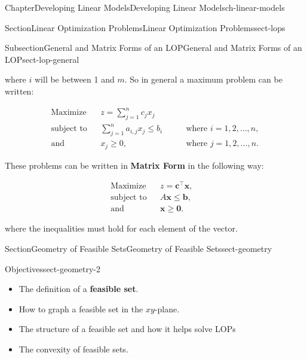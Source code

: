 \documentclass[oneside,10pt,]{book}
\newcommand{\terminology}[1]{\textbf{#1}}
\numberwithin{equation}{section}
\newcommand{\amp}{&}
\begin{document}
\begin{chapterptx}{Chapter}{Developing Linear Models}{}{Developing Linear Models}{}{}{ch-linear-models}
\begin{sectionptx}{Section}{Linear Optimization Problems}{}{Linear Optimization Problems}{}{}{sect-lops}
\begin{subsectionptx}{Subsection}{General and Matrix Forms of an LOP}{}{General and Matrix Forms of an LOP}{}{}{sect-lop-general}
%
\par
where  \(i\) will be between 1 and \(m\). So in general a maximum problem can be written:%
\par
%
\begin{equation*}
\begin{aligned} \text{Maximize} \amp \amp  z = \sum_{j=1}^n c_j x_j  \amp \\ \text{subject to} \amp \amp \sum_{j=1}^n a_{i,j} x_j \leq b_i \amp \qquad \text{where $i=1,2,\ldots,n$}, \\ \text{and} \amp \amp  x_j \geq 0, \amp \qquad\text{where $j=1,2, \ldots,n$}. \end{aligned}
\end{equation*}
%
\par
These problems can be written in \terminology{Matrix Form} in the following way:%
\par
%
\begin{equation*}
\begin{aligned}
\text{Maximize} \amp \amp z = \boldsymbol{c}^{\intercal}\boldsymbol{x}, \amp \\
\text{subject to} \amp \amp A \boldsymbol{x} \leq \boldsymbol{b}, \\
\text{and} \amp \amp \boldsymbol{x} \geq \boldsymbol{0}.
\end{aligned}
\end{equation*}
%
\par
where the inequalities must hold for each element of the vector.%
\end{subsectionptx}
\end{sectionptx}
%
%
\typeout{************************************************}
\typeout{************************************************}
%
\begin{sectionptx}{Section}{Geometry of Feasible Sets}{}{Geometry of Feasible Sets}{}{}{sect-geometry}
\begin{objectives}{Objectives}{sect-geometry-2}
%
\begin{itemize}[label=\textbullet]
\item{}The definition of a \terminology{feasible set}.%
\item{}How to graph a feasible set in the \(xy\)-plane.%
\item{}The structure of a feasible set and how it helps solve LOPs%
\item{}The convexity of feasible sets.%
\end{itemize}
\end{objectives}

\end{sectionptx}
\end{chapterptx}
\end{document}
